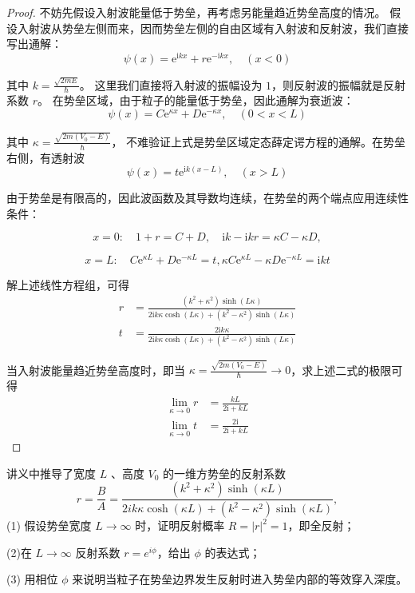 \begin{proof}
    不妨先假设入射波能量低于势垒，再考虑另能量趋近势垒高度的情况。
假设入射波从势垒左侧而来，因而势垒左侧的自由区域有入射波和反射波，我们直接写出通解：
$$\psi(x)=\mathrm{e}^{\mathrm{i} k x}+r \mathrm{e}^{-\mathrm{i} k x}, \quad(x<0)$$

其中 $k=\frac{\sqrt{2 m E}}{\hbar}$。
这里我们直接将入射波的振幅设为 $1$，则反射波的振幅就是反射系数 $r$。
在势垒区域，由于粒子的能量低于势垒，因此通解为衰逝波：
$$\psi(x)=C \mathrm{e}^{\kappa x}+D \mathrm{e}^{-\kappa x}, \quad(0<x<L)$$

其中 $\kappa=\frac{\sqrt{2 m\left(V_{0}-E\right)}}{\hbar}$，
不难验证上式是势垒区域定态薛定谔方程的通解。在势垒右侧，有透射波
$$\psi(x)=t \mathrm{e}^{\mathrm{i} k(x-L)}, \quad(x>L)$$

由于势垒是有限高的，因此波函数及其导数均连续，在势垒的两个端点应用连续性条件：

\[x=0: \quad 1+r=C+D, \quad \mathrm{i} k-\mathrm{i} k r=\kappa C-\kappa D,\]

\[x=L: \quad C \mathrm{e}^{\kappa L}+D \mathrm{e}^{-\kappa L}=t, 
\kappa C \mathrm{e}^{\kappa L}-\kappa D \mathrm{e}^{-\kappa L}=\mathrm{i} k t\]

解上述线性方程组，可得
$$
\begin{aligned}
r & =\frac{\left(k^{2}+\kappa^{2}\right) \sinh (L \kappa)}{2 \mathrm{i} k \kappa \cosh (L \kappa)+\left(k^{2}-\kappa^{2}\right) \sinh (L \kappa)} \\
t & =\frac{2 \mathrm{i} k \kappa}{2 \mathrm{i} k \kappa \cosh (L \kappa)+\left(k^{2}-\kappa^{2}\right) \sinh (L \kappa)}
\end{aligned}
$$

当入射波能量趋近势垒高度时，即当 $\kappa=\frac{\sqrt{2 m\left(V_{0}-E\right)}}{\hbar} \rightarrow 0$，求上述二式的极限可得
$$
\begin{aligned}
\lim_{\kappa \rightarrow 0} r & =\frac{kL}{2\mathrm{i}+kL} \\
\lim_{\kappa \rightarrow 0} t & =\frac{2\mathrm{i}}{2\mathrm{i}+kL}
\end{aligned}
$$
\end{proof}
\begin{3}
    讲义中推导了宽度 $L$ 、高度 $V_{0}$ 的一维方势垒的反射系数
$$r=\frac{B}{A}=\frac{\left(k^{2}+\kappa^{2}\right) \sinh (\kappa L)}{2 i k \kappa \cosh (\kappa L)
+\left(k^{2}-\kappa^{2}\right) \sinh (\kappa L)},$$
(1) 假设势垒宽度 $L \rightarrow \infty$ 时，证明反射概率 $R=|r|^{2}=1$，即全反射；

(2)在 $L \rightarrow \infty$ 反射系数 $r=e^{i \phi}$，给出 $\phi$ 的表达式；

(3) 用相位 $\phi$ 来说明当粒子在势垒边界发生反射时进入势垒内部的等效穿入深度。
\end{3}
